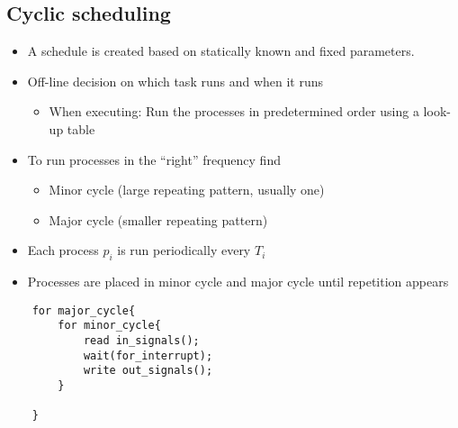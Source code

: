 \documentclass[course, english]{Notes}
\begin{document}
\subsection{Cyclic scheduling}
\begin{itemize}
	\item A schedule is created based on statically known and fixed
		parameters.
	\item Off-line decision on which task runs and when it runs
		\begin{itemize}
			\item When executing: Run the processes in predetermined
				order using a look-up table
		\end{itemize}
	\item To run processes in the ``right'' frequency find
		\begin{itemize}
			\item Minor cycle (large repeating pattern, usually one)
			\item Major cycle (smaller repeating pattern)
		\end{itemize}
	\item Each process $p_i$ is run periodically every $T_i$
	\item Processes are placed in minor cycle and major cycle until
		repetition appears
\end{itemize}

\begin{lstlisting}
	for major_cycle{
		for minor_cycle{
			read in_signals();
			wait(for_interrupt);
			write out_signals();
		}

	}
\end{lstlisting}
\end{document}

